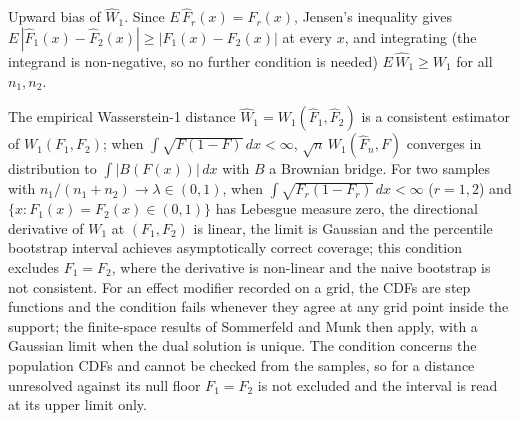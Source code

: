 \documentclass[AMA,Times1COL]{WileyNJDv5}
\begin{document}

Upward bias of $\widehat{W}_1$. Since $E\,\hat{F}_r(x) = F_r(x)$, Jensen's inequality gives $E\,|\hat{F}_1(x) - \hat{F}_2(x)| \geq |F_1(x) - F_2(x)|$ at every $x$, and integrating (the integrand is non-negative, so no further condition is needed) $E\,\widehat{W}_1 \geq W_1$ for all $n_1, n_2$.

The empirical Wasserstein-1 distance $\widehat{W}_1 = W_1(\hat{F}_1, \hat{F}_2)$ is a consistent estimator of $W_1(F_1, F_2)$; when $\int \sqrt{F(1-F)}\,dx < \infty$, $\sqrt{n}\,W_1(\hat{F}_n, F)$ converges in distribution to $\int |B(F(x))|\,dx$ with $B$ a Brownian bridge.\cite{delbarrio1999} For two samples with $n_1/(n_1+n_2) \to \lambda \in (0,1)$, when $\int \sqrt{F_r(1-F_r)}\,dx < \infty$ ($r = 1, 2$) and $\{x : F_1(x) = F_2(x) \in (0,1)\}$ has Lebesgue measure zero, the directional derivative of $W_1$ at $(F_1, F_2)$ is linear, the limit is Gaussian and the percentile bootstrap interval achieves asymptotically correct coverage;\cite{fang2019} this condition excludes $F_1 = F_2$, where the derivative is non-linear and the naive bootstrap is not consistent.\cite{dumbgen1993,fang2019} For an effect modifier recorded on a grid, the CDFs are step functions and the condition fails whenever they agree at any grid point inside the support; the finite-space results of Sommerfeld and Munk then apply,\cite{sommerfeld2018} with a Gaussian limit when the dual solution is unique. The condition concerns the population CDFs and cannot be checked from the samples, so for a distance unresolved against its null floor $F_1 = F_2$ is not excluded and the interval is read at its upper limit only.

\end{document}
